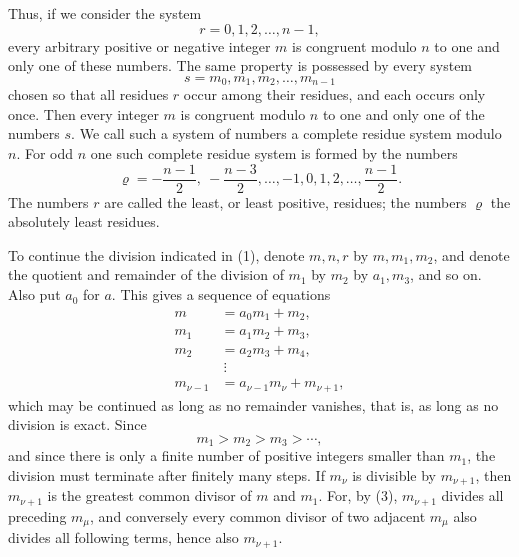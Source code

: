 \documentclass[11pt]{article}
\begin{document}
Thus, if we consider the system
\[
        r=0,1,2,\ldots,n-1,
\]
every arbitrary positive or negative integer $m$ is congruent modulo $n$ to one and only one of these numbers. The same property is possessed by every system
\[
        s=m_0,m_1,m_2,\ldots,m_{n-1}
\]
chosen so that all residues $r$ occur among their residues, and each occurs only once. Then every integer $m$ is congruent modulo $n$ to one and only one of the numbers $s$. We call such a system of numbers a complete residue system modulo $n$. For odd $n$ one such complete residue system is formed by the numbers
\[
        \varrho=-\frac{n-1}{2},\ -\frac{n-3}{2},\ldots,-1,0,1,2,\ldots,\frac{n-1}{2}.
\]
The numbers $r$ are called the least, or least positive, residues; the numbers $\varrho$ the absolutely least residues.

To continue the division indicated in (1), denote $m,n,r$ by $m,m_1,m_2$, and denote the quotient and remainder of the division of $m_1$ by $m_2$ by $a_1,m_3$, and so on. Also put $a_0$ for $a$. This gives a sequence of equations
\begin{equation}
\begin{aligned}
m&=a_0m_1+m_2,\\
m_1&=a_1m_2+m_3,\\
m_2&=a_2m_3+m_4,\\
&\ \vdots\\
m_{\nu-1}&=a_{\nu-1}m_\nu+m_{\nu+1},
\end{aligned}
\tag{3}
\end{equation}
which may be continued as long as no remainder vanishes, that is, as long as no division is exact. Since
\[
        m_1>m_2>m_3>\cdots ,
\]
and since there is only a finite number of positive integers smaller than $m_1$, the division must terminate after finitely many steps. If $m_\nu$ is divisible by $m_{\nu+1}$, then $m_{\nu+1}$ is the greatest common divisor of $m$ and $m_1$. For, by (3), $m_{\nu+1}$ divides all preceding $m_\mu$, and conversely every common divisor of two adjacent $m_\mu$ also divides all following terms, hence also $m_{\nu+1}$.
\end{document}
